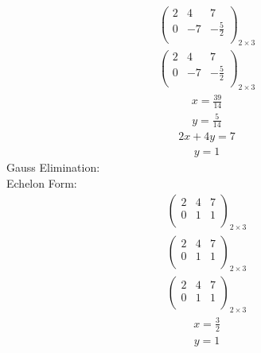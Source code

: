 \documentclass{article}
\begin{document}
\begin{align*}
\left(
\begin{array}{cc|c}
2 & 4 & 7\\
0 & -7 & -\frac{5}{2}\\
\end{array}
\right)_{2\times 3}
\end{align*}
\begin{align*}
\left(
\begin{array}{cc|c}
2 & 4 & 7\\
0 & -7 & -\frac{5}{2}\\
\end{array}
\right)_{2\times 3}
\end{align*}
\begin{align*}
x=\frac{39}{14}\end{align*}
\begin{align*}
y=\frac{5}{14}\end{align*}
\begin{align*}
2x + 4y=7\end{align*}
\begin{align*}
y=1\end{align*}
Gauss Elimination:\\
Echelon Form:\\
\begin{align*}
\left(
\begin{array}{cc|c}
2 & 4 & 7\\
0 & 1 & 1\\
\end{array}
\right)_{2\times 3}
\end{align*}
\begin{align*}
\left(
\begin{array}{cc|c}
2 & 4 & 7\\
0 & 1 & 1\\
\end{array}
\right)_{2\times 3}
\end{align*}
\begin{align*}
\left(
\begin{array}{cc|c}
2 & 4 & 7\\
0 & 1 & 1\\
\end{array}
\right)_{2\times 3}
\end{align*}
\begin{align*}
x=\frac{3}{2}\end{align*}
\begin{align*}
y=1\end{align*}
\end{document}
